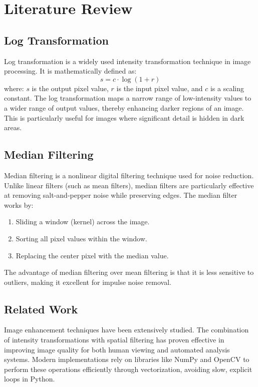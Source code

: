 \documentclass[12pt,a4paper]{article}
\begin{document}
\section{Literature Review}
\subsection{Log Transformation}
Log transformation is a widely used intensity transformation technique in image processing. It is mathematically defined as:
\begin{equation}
    s = c \cdot \log(1 + r)
\end{equation}
where: $s$ is the output pixel value, $r$ is the input pixel value, and $c$ is a scaling constant. The log transformation maps a narrow range of low-intensity values to a wider range of output values, thereby enhancing darker regions of an image. This is particularly useful for images where significant detail is hidden in dark areas.

\subsection{Median Filtering}
Median filtering is a nonlinear digital filtering technique used for noise reduction. Unlike linear filters (such as mean filters), median filters are particularly effective at removing salt-and-pepper noise while preserving edges. The median filter works by:
\begin{enumerate}
    \item Sliding a window (kernel) across the image.
    \item Sorting all pixel values within the window.
    \item Replacing the center pixel with the median value.
\end{enumerate}
The advantage of median filtering over mean filtering is that it is less sensitive to outliers, making it excellent for impulse noise removal.

\subsection{Related Work}
Image enhancement techniques have been extensively studied. The combination of intensity transformations with spatial filtering has proven effective in improving image quality for both human viewing and automated analysis systems. Modern implementations rely on libraries like NumPy and OpenCV to perform these operations efficiently through vectorization, avoiding slow, explicit loops in Python.
\end{document}
